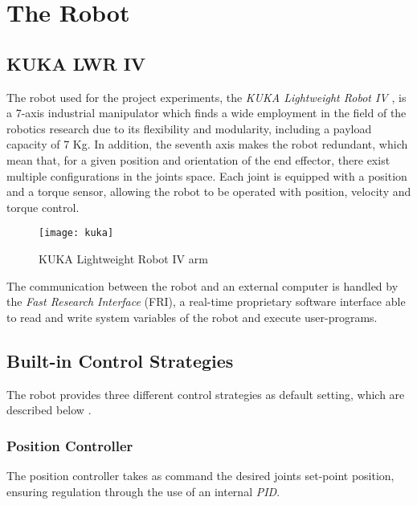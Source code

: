 \section{The Robot}\label{sec:therobot}
\subsection{KUKA LWR IV}

The robot used for the project experiments, the \textit{KUKA Lightweight Robot IV} \cite{webkuka}, is a 7-axis industrial manipulator which finds a wide employment in the field of the robotics research due to its flexibility and modularity, including a payload capacity of 7 Kg. In addition, the seventh axis makes the robot redundant, which mean that, for a given position and orientation of the end effector, there exist multiple configurations in the joints space. Each joint is equipped with a position and a torque sensor, allowing the robot to be operated with position, velocity and torque control. 

\begin{figure}[h]
\centering
\texttt{[image: kuka]}
\caption{KUKA Lightweight Robot IV arm}
\end{figure}

The communication between the robot and an external computer is handled by the \textit{Fast Research Interface} (FRI), a real-time proprietary software interface able to read and write system variables of the robot and execute user-programs.

\subsection{Built-in Control Strategies}
The robot provides three different control strategies as default setting, which are described below \cite{kukafri}.
\subsubsection*{Position Controller}
The position controller takes as command the desired joints set-point position, ensuring regulation through the use of an internal \textit{PID}. 

